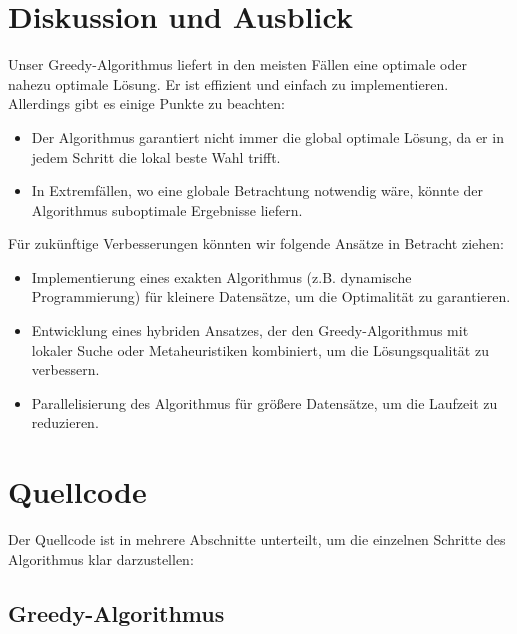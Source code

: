 \documentclass[a4paper,10pt,ngerman]{scrartcl}
\begin{document}
\section{Diskussion und Ausblick}

Unser Greedy-Algorithmus liefert in den meisten Fällen eine optimale oder nahezu optimale Lösung. Er ist effizient und einfach zu implementieren. Allerdings gibt es einige Punkte zu beachten:

\begin{itemize}
    \item Der Algorithmus garantiert nicht immer die global optimale Lösung, da er in jedem Schritt die lokal beste Wahl trifft.
    \item In Extremfällen, wo eine globale Betrachtung notwendig wäre, könnte der Algorithmus suboptimale Ergebnisse liefern.

\end{itemize}

Für zukünftige Verbesserungen könnten wir folgende Ansätze in Betracht ziehen:

\begin{itemize}
    \item Implementierung eines exakten Algorithmus (z.B. dynamische Programmierung) für kleinere Datensätze, um die Optimalität zu garantieren.
    \item Entwicklung eines hybriden Ansatzes, der den Greedy-Algorithmus mit lokaler Suche oder Metaheuristiken kombiniert, um die Lösungsqualität zu verbessern.
    \item Parallelisierung des Algorithmus für größere Datensätze, um die Laufzeit zu reduzieren.
\end{itemize}

\section{Quellcode}

Der Quellcode ist in mehrere Abschnitte unterteilt, um die einzelnen Schritte des Algorithmus klar darzustellen:

\subsection{Greedy-Algorithmus}
\end{document}
